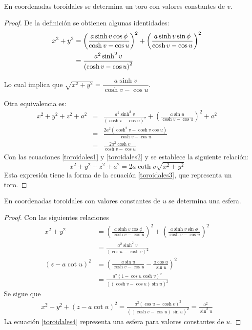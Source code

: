 \begin{prop}
En coordenadas toroidales se determina un toro con valores constantes de $v$.
\end{prop}

\begin{proof}
De la definición se obtienen algunas identidades:
\begin{align}
x^2+y^2 &= \left( \frac{a\sinh v\cos \phi }{\cosh v-\cos u}\right)^2+\left( \frac{a\sinh v\sin \phi }{\cosh v-\cos u}\right) ^2 \notag \\
&=  \frac{a^2 \sinh ^2v}{\left(\cosh v-\cos u\right) ^2} \label{toroidales1}
\end{align}

Lo cual implica que $\sqrt{x^2+y^2}=\dfrac{a\sinh v}{\cosh v-\cos u}$.

Otra equivalencia es:
\begin{eqnarray}
x^2+y^2+z^2+a^2 &=& \frac{a^2 \sinh ^2v}{\left(\cosh v-\cos u\right) ^2}
+\left( \frac{a\sin u}{\cosh v-\cos u}\right) ^2+a^2 \nonumber \\
&=& \frac{2a^2 (\cosh ^{2}v-\cosh v\cos u)}{\cosh v-\cos u} \\
&=& \frac{2a^2 \cosh v}{\cosh v-\cos u} \label{toroidales2}
\end{eqnarray}
Con las ecuaciones \ref{toroidales1} y \ref{toroidales2} y se establece la siguiente relación:
\begin{equation}
x^2+y^2+z^2+a^2=2a\coth v\sqrt{x^2+y^2}
\end{equation}
Esta expresión tiene la forma de la ecuación \ref{toroidales3},
que representa un toro.
\end{proof}

\begin{prop}
En coordenadas toroidales con valores constantes de $u$ se determina una esfera.
\end{prop}

\begin{proof}
Con las siguientes relaciones
\begin{align*}
x^{2}+y^{2} &=\left( \frac{a\sinh v\cos \phi }{\cosh v-\cos u}\right)^{2}
+\left( \frac{a\sinh v\sin \phi }{\cosh v-\cos u}\right)^{2} \\
&= \frac{a^{2}\sinh ^{2}v}{\left( \cos u-\cosh v\right) ^{2}} \\
\left( z-a\cot u\right) ^{2} &= \left( \frac{a\sin u}{\cosh v-\cos u}-\frac{a\cos u}{\sin u}\right) ^{2} \\
&= \frac{a^{2}\left( 1-\cos u\cosh v\right) ^{2}}{\left(\left( \cosh v-\cos u\right) \sin u\right) ^{2}}
\end{align*}
Se sigue que
\begin{gather}
x^{2}+y^{2}+\left( z-a\cot u\right) ^{2}
= \frac{a^{2}\left( \cos u-\cosh v\right) ^{2}}{\left( \left( \cosh v-\cos u\right)
\sin u\right) ^{2}} =\frac{a^{2}}{\sin ^{2}u} \label{toroidales4}
\end{gather}
La ecuación \ref{toroidales4} representa una esfera para valores constantes de $u$.
\end{proof}

